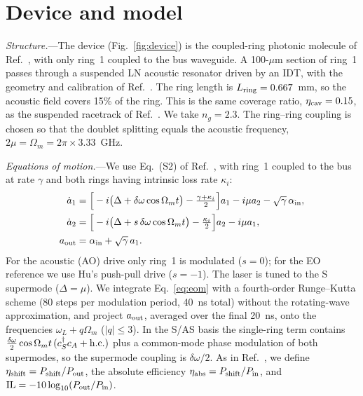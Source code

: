 \documentclass[aps,prapplied,reprint,superscriptaddress,amsmath,amssymb,floatfix]{revtex4-2}
\newcommand{\etash}{\eta_{\rm shift}}
\newcommand{\etaabs}{\eta_{\rm abs}}
\begin{document}
\section{Device and model}\label{sec:model}
\emph{Structure.}---The device (Fig.~\ref{fig:device}) is the coupled-ring photonic molecule of Ref.~\cite{Hu2021}, with only ring~1 coupled to the bus waveguide. A 100-$\mu$m section of ring~1 passes through a suspended LN acoustic resonator driven by an IDT, with the geometry and calibration of Ref.~\cite{Shao2019}. The ring length is $L_{\rm ring}=0.667$~mm, so the acoustic field covers 15\% of the ring. This is the same coverage ratio, $\eta_{\rm cav}=0.15$, as the suspended racetrack of Ref.~\cite{Shao2019}. We take $n_g=2.3$. The ring--ring coupling is chosen so that the doublet splitting equals the acoustic frequency, $2\mu=\Omega_m=2\pi\times3.33$~GHz.

\emph{Equations of motion.}---We use Eq.~(S2) of Ref.~\cite{Hu2021}, with ring~1 coupled to the bus at rate $\gamma$ and both rings having intrinsic loss rate $\kappa_i$:
\begin{align}
\dot a_1&=\Big[-i\big(\Delta+\delta\omega\cos\Omega_m t\big)-\tfrac{\gamma+\kappa_i}{2}\Big]a_1-i\mu a_2-\sqrt{\gamma}\,\alpha_{\rm in},\nonumber\\
\dot a_2&=\Big[-i\big(\Delta+s\,\delta\omega\cos\Omega_m t\big)-\tfrac{\kappa_i}{2}\Big]a_2-i\mu a_1,\nonumber\\
a_{\rm out}&=\alpha_{\rm in}+\sqrt{\gamma}\,a_1 .
\label{eq:eom}
\end{align}
For the acoustic (AO) drive only ring~1 is modulated ($s=0$); for the EO reference we use Hu's push-pull drive ($s=-1$). The laser is tuned to the S supermode ($\Delta=\mu$). We integrate Eq.~\eqref{eq:eom} with a fourth-order Runge--Kutta scheme (80 steps per modulation period, 40~ns total) without the rotating-wave approximation, and project $a_{\rm out}$, averaged over the final 20~ns, onto the frequencies $\omega_L+q\Omega_m$ ($|q|\le3$). In the S/AS basis the single-ring term contains $\tfrac{\delta\omega}{2}\cos\Omega_m t\,(c_S^\dagger c_A+{\rm h.c.})$ plus a common-mode phase modulation of both supermodes, so the supermode coupling is $\delta\omega/2$. As in Ref.~\cite{Hu2021}, we define $\etash=P_{\rm shift}/P_{\rm out}$, the absolute efficiency $\etaabs=P_{\rm shift}/P_{\rm in}$, and ${\rm IL}=-10\log_{10}(P_{\rm out}/P_{\rm in})$.
\end{document}
